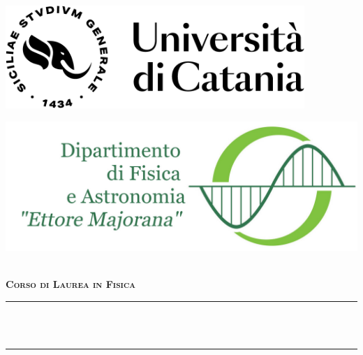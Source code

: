 
\begin{titlepage}
\begin{center}
    \begin{minipage}[c]{0.45\textwidth}
        \begin{flushleft}
            \includegraphics[width=0.85\textwidth]{immagini/foto_dfa/UniCT-Logo-Nero.png}
        \end{flushleft}
    \end{minipage}
            \hfill
    \begin{minipage}[c]{0.45\textwidth}
        \begin{flushright}
            \includegraphics[width=\textwidth]{immagini/foto_dfa/logo_dfa_orizzontale.jpg}
        \end{flushright}
    \end{minipage}\\
    \medskip
    \scshape{\bfseries Corso di Laurea in Fisica}
    \rule{\textwidth}{1pt}\\
    \vspace{4cm}
    \huge
    \\
    \medskip
    \rule{\textwidth}{1pt}\\
    \medskip
    \large

    \vspace{2.5cm}

    
    \vspace{2.5cm}
    \normalsize


    \vfill
\end{center}
\end{titlepage}
    
\restoregeometry